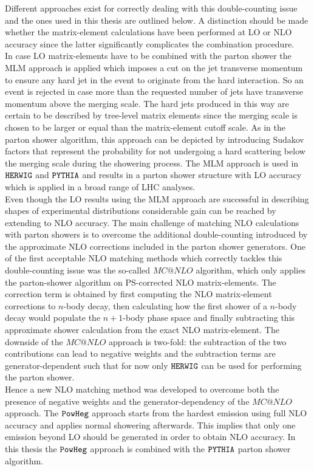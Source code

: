 Different approaches exist for correctly dealing with this double-counting issue and the ones used in this thesis are outlined below. A distinction should be made whether the matrix-element calculations have been performed at LO or NLO accuracy since the latter significantly complicates the combination procedure.\\
In case LO matrix-elements have to be combined with the parton shower the MLM approach is applied which imposes a cut on the jet transverse momentum to ensure any hard jet in the event to originate from the hard interaction. So an event is rejected in case more than the requested number of jets have transverse momentum above the merging scale. The hard jets produced in this way are certain to be described by tree-level matrix elements since the merging scale is chosen to be larger or equal than the matrix-element cutoff scale.
As in the parton shower algorithm, this approach can be depicted by introducing Sudakov factors that represent the probability for not undergoing a hard scattering below the merging scale during the showering process.
The MLM approach is used in $\texttt{HERWIG}$ and $\texttt{PYTHIA}$ and results in a parton shower structure with LO accuracy which is applied in a broad range of LHC analyses.
\\
Even though the LO results using the MLM approach are successful in describing shapes of experimental distributions considerable gain can be reached by extending to NLO accuracy. 
The main challenge of matching NLO calculations with parton showers is to overcome the additional double-counting introduced by the approximate NLO corrections included in the parton shower generators. 
One of the first acceptable NLO matching methods which correctly tackles this double-counting issue was the so-called $MC@NLO$ algorithm, which only applies the parton-shower algorithm on PS-corrected NLO matrix-elements.
The correction term is obtained by first computing the NLO matrix-element corrections to $n$-body decay, then calculating how the first shower of a $n$-body decay would populate the $n+1$-body phase space and finally subtracting this approximate shower calculation from the exact NLO matrix-element. The downside of the $MC@NLO$ approach is two-fold: the subtraction of the two contributions can lead to negative weights and the subtraction terms are generator-dependent such that for now only $\texttt{HERWIG}$ can be used for performing the parton shower. 
\\
Hence a new NLO matching method was developed to overcome both the presence of negative weights and the generator-dependency of the $MC@NLO$ approach. The $\texttt{PowHeg}$ approach starts from the hardest emission using full NLO accuracy and applies normal showering afterwards. This implies that only one emission beyond LO should be generated in order to obtain NLO accuracy. In this thesis the $\texttt{PowHeg}$ approach is combined with the $\texttt{PYTHIA}$ parton shower algorithm.

